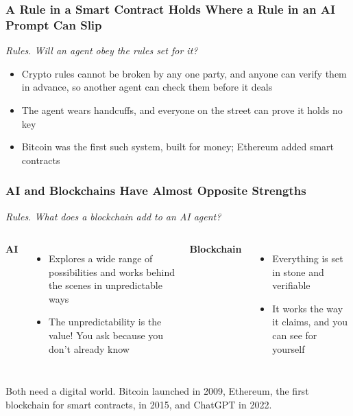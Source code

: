 \documentclass[aspectratio=169]{beamer}
\newcommand{\lead}[1]{{\small\itshape\textcolor{gtnavy!80}{#1}}\par\vspace{1.5mm}}
\newcommand{\bi}{\begin{itemize}}
\newcommand{\ei}{\end{itemize}}
\newcommand{\m}{\item}
\begin{document}
\begin{frame}[label=main-rule]
\frametitle{A Rule in a Smart Contract Holds Where a Rule in an AI Prompt Can Slip}
\lead{Rules. Will an agent obey the rules set for it?}

\begin{center}
\end{center}

\bi
\m Crypto rules cannot be broken by any one party, and anyone can verify them in advance, so another agent can check them before it deals
\m The agent wears handcuffs, and everyone on the street can prove it holds no key
\m Bitcoin was the first such system, built for money; Ethereum added smart contracts
\ei
\par\vspace{0pt plus 1fill}\hfill{\scriptsize \hyperlink{appx-harness}{}}
\end{frame}


\begin{frame}[label=main-opposite]
\frametitle{AI and Blockchains Have Almost Opposite Strengths}
\lead{Rules. What does a blockchain add to an AI agent?}

\begin{columns}[T]
\textbf{\textcolor{gtnavy}{AI}}
\bi
\m Explores a wide range of possibilities and works behind the scenes in unpredictable ways
\m The unpredictability is the value! You ask because you don't already know
\ei
{}
\textbf{\textcolor{gtnavy}{Blockchain}}
\bi
\m Everything is set in stone and verifiable
\m It works the way it claims, and you can see for yourself
\ei
\end{columns}
\vspace{4mm}
Both need a digital world. Bitcoin launched in 2009, Ethereum, the first blockchain for smart contracts, in 2015, and ChatGPT in 2022.
\end{frame}
\end{document}

